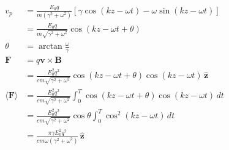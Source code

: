 \documentclass{article}
\renewcommand{\vec}[1]{\boldsymbol{\mathbf{#1}}}
\newcommand{\uvec}[1]{\hat{\vec{#1}}}
\begin{document}
\begin{enumerate}
\begin{align*}
          v_p                                      & = \frac{E_0 q}{m (\gamma^2 + \omega^2)} [\gamma \cos (k z - \omega t) - \omega \sin (k z - \omega t)]                  \\
                                                   & = \frac{E_0 q}{m \sqrt{\gamma^2 + \omega^2}} \cos (k z - \omega t + \theta)                                            \\
          \theta                                   & = \arctan \frac{\omega}{\gamma}                                                                                        \\
          \vec{F}                                  & = q \vec{v} \times \vec{B}                                                                                             \\
                                                   & = \frac{E_0^2 q^2}{c m \sqrt{\gamma^2 + \omega^2}} \cos (k z - \omega t + \theta) \cos (k z - \omega t) \,\uvec{z}     \\
          \langle \vec{F} \rangle                  & = \frac{E_0^2 q^2}{c m \sqrt{\gamma^2 + \omega^2}} \int_0^T \cos (k z - \omega t + \theta) \cos (k z - \omega t) \,d t \\
                                                   & = \frac{E_0^2 q^2}{c m \sqrt{\gamma^2 + \omega^2}} \cos \theta \int_0^T \cos^2 (k z - \omega t) \,d t                  \\
                                                   & = \frac{\pi \gamma E_0^2 q^2}{c m \omega (\gamma^2 + \omega^2)} \,\uvec{z}
        \end{align*}
\end{enumerate}

\subsection{}
\end{document}
